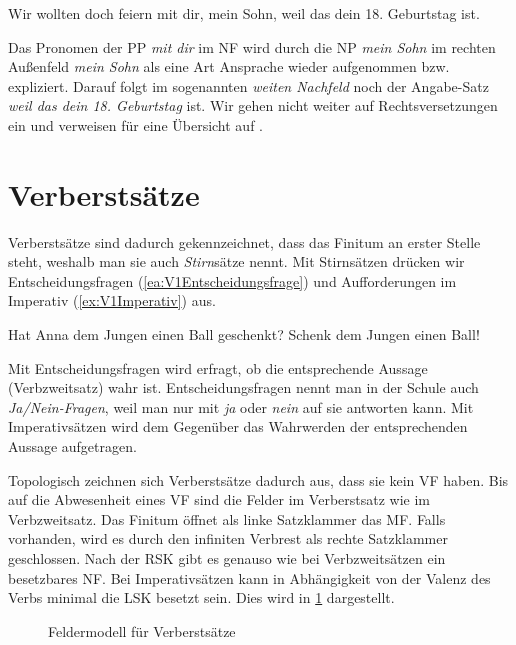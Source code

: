 \ea \label{ea:rechtesAußenfeld} Wir wollten doch feiern mit dir, mein Sohn, weil das dein 18. Geburtstag ist.
\z 

Das Pronomen der PP \textit{mit dir} im NF wird durch die NP \textit{mein Sohn} im rechten Außenfeld \textit{mein Sohn} als eine Art Ansprache wieder aufgenommen bzw. expliziert. Darauf folgt im sogenannten \textit{weiten Nachfeld} noch der Angabe-Satz \textit{weil das dein 18. Geburtstag} ist. Wir gehen nicht weiter auf Rechtsversetzungen ein und verweisen für eine Übersicht auf \citet[153--157]{AltmannHofman}.  


\section{Verberstsätze}\label{section:Verberstsatz}

Verberstsätze sind dadurch gekennzeichnet, dass das Finitum an erster Stelle steht, weshalb man sie auch \textit{Stirn}sätze nennt. Mit Stirnsätzen drücken wir Entscheidungsfragen (\ref{ea:V1Entscheidungsfrage}) und Aufforderungen im Imperativ (\ref{ex:V1Imperativ}) aus.

\ea \label{ea:Verberst}
\ea \label{ea:V1Entscheidungsfrage} Hat Anna dem Jungen einen Ball geschenkt?
\ex \label{ex:V1Imperativ} Schenk dem Jungen einen Ball!
\z 
\z 

Mit Entscheidungsfragen wird erfragt, ob die entsprechende Aussage (Verbzweitsatz) wahr ist. Entscheidungsfragen nennt man in der Schule auch \textit{Ja/Nein-Fragen}, weil man nur mit \textit{ja} oder \textit{nein} auf sie antworten kann. Mit Imperativsätzen wird dem Gegenüber das Wahrwerden der entsprechenden Aussage aufgetragen. 

Topologisch zeichnen sich Verberstsätze dadurch aus, dass sie kein VF haben. Bis auf die Abwesenheit eines VF sind die Felder im Verberstsatz wie im Verbzweitsatz. Das Finitum öffnet als linke Satzklammer das MF. Falls vorhanden, wird es durch den infiniten Verbrest als rechte Satzklammer geschlossen. Nach der RSK gibt es genauso wie bei Verbzweitsätzen ein besetzbares NF. Bei Imperativsätzen kann in Abhängigkeit von der Valenz des Verbs minimal die LSK besetzt sein. Dies wird in \ref{fig:Verberstfelder} dargestellt.

\begin{figure}[!htbp]
  \centering
  \caption{Feldermodell für Verberstsätze}
  \label{fig:Verberstfelder}
\end{figure}

